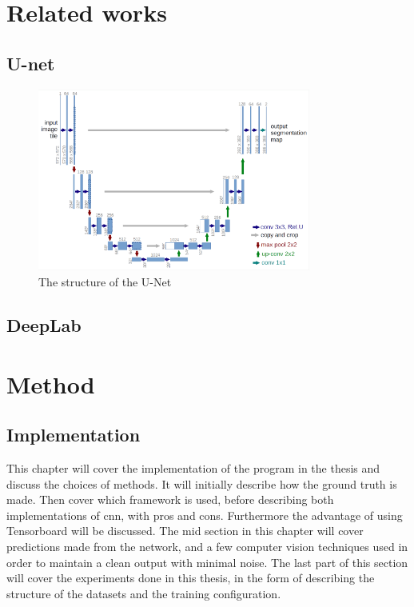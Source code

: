 \documentclass[USenglish]{ifimaster}  %
\begin{document}
\chapter{Related works}
\section{U-net}

\begin{figure}[ht]
    \centering
    \includegraphics[width=0.8\textwidth]{bilder/u_net.png}
    \caption{The structure of the U-Net \cite{website:u_net}}
    \label{fig:u_net}
\end{figure}

\section{DeepLab}

\chapter{Method}
\section{Implementation}
This chapter will cover the implementation of the program in the thesis and discuss the choices of methods. It will initially describe how the ground truth is made. Then cover which framework is used, before describing both implementations of \ac{cnn}, with pros and cons. Furthermore the advantage of using Tensorboard will be discussed. The mid section in this chapter will cover predictions made from the network, and a few computer vision techniques used in order to maintain a clean output with minimal noise. The last part of this section will cover the experiments done in this thesis, in the form of describing the structure of the datasets and the training configuration.
\end{document}
